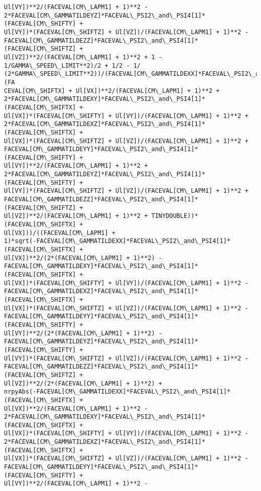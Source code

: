 \documentclass[landscape,letterpaper,10pt,english]{article}
\begin{document}
\begin{Verbatim}[commandchars=\\\{\}]
Ul[VY])**2/(FACEVAL[CM\_LAPM1] + 1)**2 -
2*FACEVAL[CM\_GAMMATILDEYZ]*FACEVAL\_PSI2\_and\_PSI4[1]*(FACEVAL[CM\_SHIFTY] +
Ul[VY])*(FACEVAL[CM\_SHIFTZ] + Ul[VZ])/(FACEVAL[CM\_LAPM1] + 1)**2 -
FACEVAL[CM\_GAMMATILDEZZ]*FACEVAL\_PSI2\_and\_PSI4[1]*(FACEVAL[CM\_SHIFTZ] +
Ul[VZ])**2/(FACEVAL[CM\_LAPM1] + 1)**2 + 1 - 1/GAMMA\_SPEED\_LIMIT**2)/2 + 1/2 - 1/
(2*GAMMA\_SPEED\_LIMIT**2))/(FACEVAL[CM\_GAMMATILDEXX]*FACEVAL\_PSI2\_and\_PSI4[1]*(FA
CEVAL[CM\_SHIFTX] + Ul[VX])**2/(FACEVAL[CM\_LAPM1] + 1)**2 +
2*FACEVAL[CM\_GAMMATILDEXY]*FACEVAL\_PSI2\_and\_PSI4[1]*(FACEVAL[CM\_SHIFTX] +
Ul[VX])*(FACEVAL[CM\_SHIFTY] + Ul[VY])/(FACEVAL[CM\_LAPM1] + 1)**2 +
2*FACEVAL[CM\_GAMMATILDEXZ]*FACEVAL\_PSI2\_and\_PSI4[1]*(FACEVAL[CM\_SHIFTX] +
Ul[VX])*(FACEVAL[CM\_SHIFTZ] + Ul[VZ])/(FACEVAL[CM\_LAPM1] + 1)**2 +
FACEVAL[CM\_GAMMATILDEYY]*FACEVAL\_PSI2\_and\_PSI4[1]*(FACEVAL[CM\_SHIFTY] +
Ul[VY])**2/(FACEVAL[CM\_LAPM1] + 1)**2 +
2*FACEVAL[CM\_GAMMATILDEYZ]*FACEVAL\_PSI2\_and\_PSI4[1]*(FACEVAL[CM\_SHIFTY] +
Ul[VY])*(FACEVAL[CM\_SHIFTZ] + Ul[VZ])/(FACEVAL[CM\_LAPM1] + 1)**2 +
FACEVAL[CM\_GAMMATILDEZZ]*FACEVAL\_PSI2\_and\_PSI4[1]*(FACEVAL[CM\_SHIFTZ] +
Ul[VZ])**2/(FACEVAL[CM\_LAPM1] + 1)**2 + TINYDOUBLE))*(FACEVAL[CM\_SHIFTX] +
Ul[VX]))/((FACEVAL[CM\_LAPM1] +
1)*sqrt(-FACEVAL[CM\_GAMMATILDEXX]*FACEVAL\_PSI2\_and\_PSI4[1]*(FACEVAL[CM\_SHIFTX] +
Ul[VX])**2/(2*(FACEVAL[CM\_LAPM1] + 1)**2) -
FACEVAL[CM\_GAMMATILDEXY]*FACEVAL\_PSI2\_and\_PSI4[1]*(FACEVAL[CM\_SHIFTX] +
Ul[VX])*(FACEVAL[CM\_SHIFTY] + Ul[VY])/(FACEVAL[CM\_LAPM1] + 1)**2 -
FACEVAL[CM\_GAMMATILDEXZ]*FACEVAL\_PSI2\_and\_PSI4[1]*(FACEVAL[CM\_SHIFTX] +
Ul[VX])*(FACEVAL[CM\_SHIFTZ] + Ul[VZ])/(FACEVAL[CM\_LAPM1] + 1)**2 -
FACEVAL[CM\_GAMMATILDEYY]*FACEVAL\_PSI2\_and\_PSI4[1]*(FACEVAL[CM\_SHIFTY] +
Ul[VY])**2/(2*(FACEVAL[CM\_LAPM1] + 1)**2) -
FACEVAL[CM\_GAMMATILDEYZ]*FACEVAL\_PSI2\_and\_PSI4[1]*(FACEVAL[CM\_SHIFTY] +
Ul[VY])*(FACEVAL[CM\_SHIFTZ] + Ul[VZ])/(FACEVAL[CM\_LAPM1] + 1)**2 -
FACEVAL[CM\_GAMMATILDEZZ]*FACEVAL\_PSI2\_and\_PSI4[1]*(FACEVAL[CM\_SHIFTZ] +
Ul[VZ])**2/(2*(FACEVAL[CM\_LAPM1] + 1)**2) +
nrpyAbs(-FACEVAL[CM\_GAMMATILDEXX]*FACEVAL\_PSI2\_and\_PSI4[1]*(FACEVAL[CM\_SHIFTX] +
Ul[VX])**2/(FACEVAL[CM\_LAPM1] + 1)**2 -
2*FACEVAL[CM\_GAMMATILDEXY]*FACEVAL\_PSI2\_and\_PSI4[1]*(FACEVAL[CM\_SHIFTX] +
Ul[VX])*(FACEVAL[CM\_SHIFTY] + Ul[VY])/(FACEVAL[CM\_LAPM1] + 1)**2 -
2*FACEVAL[CM\_GAMMATILDEXZ]*FACEVAL\_PSI2\_and\_PSI4[1]*(FACEVAL[CM\_SHIFTX] +
Ul[VX])*(FACEVAL[CM\_SHIFTZ] + Ul[VZ])/(FACEVAL[CM\_LAPM1] + 1)**2 -
FACEVAL[CM\_GAMMATILDEYY]*FACEVAL\_PSI2\_and\_PSI4[1]*(FACEVAL[CM\_SHIFTY] +
Ul[VY])**2/(FACEVAL[CM\_LAPM1] + 1)**2 -

\end{Verbatim}
\end{document}
